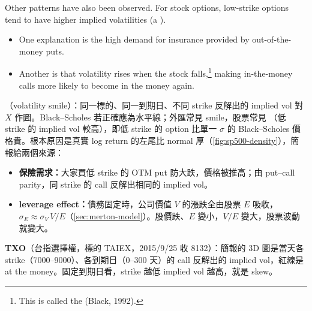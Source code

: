 Other patterns have also been observed.
For stock options, low-strike options tend to have higher implied volatilities (a ).
\begin{itemize}[nosep]
	\item One explanation is the high demand for insurance provided by out-of-the-money puts.
	\item Another is that volatility rises when the stock falls,\footnote{This is called the  (Black, 1992).} making in-the-money calls more likely to become in the money again.
\end{itemize}

\suppstart
\begin{remark}
	（volatility smile）：同一標的、同一到期日、不同 strike 反解出的 implied vol 對 $X$ 作圖。Black--Scholes 若正確應為水平線；外匯常見 smile，股票常見 （低 strike 的 implied vol 較高），即低 strike 的 option 比單一 $\sigma$ 的 Black--Scholes 價格貴。根本原因是真實 log return 的左尾比 normal 厚（\autoref{fig:sp500-density}），簡報給兩個來源：
	\begin{itemize}[nosep]
		\item \textbf{保險需求：}大家買低 strike 的 OTM put 防大跌，價格被推高；由 put--call parity，同 strike 的 call 反解出相同的 implied vol。
		\item \textbf{leverage effect：}債務固定時，公司價值 $V$ 的漲跌全由股票 $E$ 吸收，$\sigma_{E}\approx\sigma_{V}\,V/E$（\autoref{sec:merton-model}）。股價跌、$E$ 變小，$V/E$ 變大，股票波動就變大。
	\end{itemize}
	\textbf{TXO}（台指選擇權，標的 TAIEX，2015/9/25 收 8132）：簡報的 3D 圖是當天各 strike（7000--9000）、各到期日（0--300 天）的 call 反解出的 implied vol，紅線是 at the money。固定到期日看，strike 越低 implied vol 越高，就是 skew。
\end{remark}

